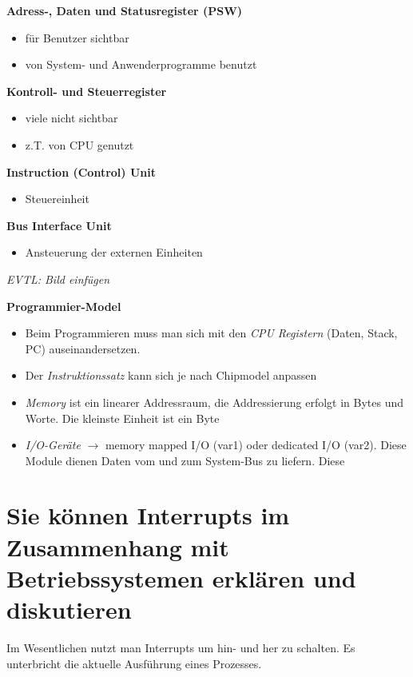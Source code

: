 \documentclass{report}
\theoremstyle{definition}
\theoremstyle{example}
\begin{document}
\textbf{Adress-, Daten und Statusregister (PSW)}\\
 \begin{itemize}
 	\item für Benutzer sichtbar
 	\item von System- und Anwenderprogramme benutzt
 \end{itemize}
 
\textbf{Kontroll- und Steuerregister}\\
\begin{itemize}
	\item viele nicht sichtbar
	\item z.T. von CPU genutzt
\end{itemize}

\textbf{Instruction (Control) Unit}\\
\begin{itemize}
	\item Steuereinheit
\end{itemize}

\textbf{Bus Interface Unit}\\
\begin{itemize}
	\item Ansteuerung der externen Einheiten
\end{itemize}

\textit{EVTL: Bild einfügen}

\textbf{Programmier-Model}\\
\begin{itemize}
	\item Beim Programmieren muss man sich mit den \textit{CPU Registern} (Daten, Stack, PC) auseinandersetzen. 
	\item Der \textit{Instruktionssatz} kann sich je nach Chipmodel anpassen
	\item \textit{Memory} ist ein linearer Addressraum, die Addressierung erfolgt in Bytes und Worte. Die kleinste Einheit ist ein Byte
	\item \textit{I/O-Geräte} $\rightarrow$ memory mapped I/O (var1) oder dedicated I/O (var2). Diese Module dienen Daten vom und zum System-Bus zu liefern. Diese 
\end{itemize}
		

\section{Sie können Interrupts im Zusammenhang mit Betriebssystemen erklären und diskutieren}
Im Wesentlichen nutzt man Interrupts um hin- und her zu schalten. Es unterbricht die aktuelle Ausführung eines Prozesses.
\end{document}
